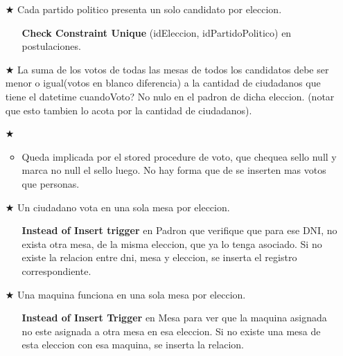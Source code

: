 \vspace{1.2cm}
\begin{itemize}
		\item[$\bigstar$] Cada partido politico presenta un solo candidato por eleccion.
		\begin{itemize}
			\item[\Checkmark] \textbf{Check Constraint Unique} (idEleccion, idPartidoPolitico) en postulaciones.
		\end{itemize}
\end{itemize}
\vspace{1.2cm}
\begin{itemize}
		\item[$\bigstar$] La suma de los votos de todas las mesas de todos los candidatos debe ser menor o igual(votos en blanco diferencia) a la cantidad de ciudadanos que tiene el datetime cuandoVoto? No nulo en el padron de dicha eleccion. (notar que esto tambien lo acota por la cantidad de ciudadanos). 
		\item[$\bigstar$] 
		\begin{itemize}
			\item{Queda implicada por el stored procedure de voto, que chequea sello null y marca no null el sello luego. No hay forma que de se inserten mas votos que personas}.
		\end{itemize}
\end{itemize}
\vspace{1.2cm}
\begin{itemize}
		\item[$\bigstar$] Un ciudadano vota en una sola mesa por eleccion.
		\begin{itemize}
			\item[\Checkmark] \textbf{Instead of Insert trigger} en Padron que verifique que para ese DNI, no exista otra mesa, de la misma eleccion, que ya lo tenga asociado. Si no existe la relacion entre dni, mesa y eleccion, se inserta el registro correspondiente.
		\end{itemize}
\end{itemize}
\vspace{1.2cm}
\begin{itemize}
		\item[$\bigstar$] Una maquina funciona en una sola mesa por eleccion.
		\begin{itemize}
			\item[\Checkmark] \textbf{Instead of Insert Trigger} en Mesa para ver que la maquina asignada no este asignada a otra mesa en esa eleccion. Si no existe una mesa de esta eleccion con esa maquina, se inserta la relacion. 
		\end{itemize}
\end{itemize}

